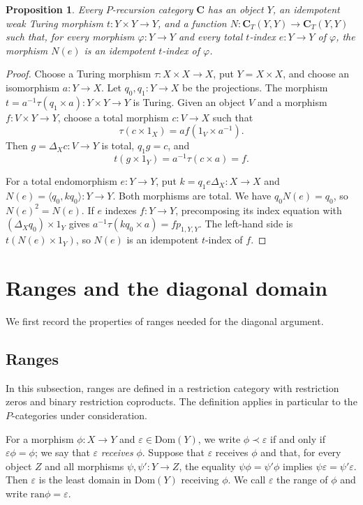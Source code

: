 \documentclass[letterpaper,10pt]{amsart}
\theoremstyle{plain}
\newtheorem{prop}[thm]{Proposition}
\theoremstyle{definition}
\begin{document}
\begin{prop}\label{IdempotentTheorem}
Every $P$-recursion category $\mathbf C$ has an object $Y$, an
idempotent weak Turing morphism $t:Y\times Y\to Y$, and a function
$N:\mathbf C_T(Y,Y)\to\mathbf C_T(Y,Y)$ such that, for every
morphism $\varphi:Y\to Y$ and every total $t$-index $e:Y\to Y$ of
$\varphi$, the morphism $N(e)$ is an idempotent $t$-index of $\varphi$.
\end{prop}
\begin{proof}
Choose a Turing morphism $\tau:X\times X\to X$, put $Y=X\times X$,
and choose an isomorphism $a:Y\to X$. Let $q_0,q_1:Y\to X$ be
the projections. The morphism
$t=a^{-1}\tau(q_1\times a):Y\times Y\to Y$ is Turing. Given an
object $V$ and a morphism $f:V\times Y\to Y$, choose a total
morphism $c:V\to X$ such that
\[
 \tau(c\times1_X)=af(1_V\times a^{-1}).
\]
Then $g=\Delta_Xc:V\to Y$ is total, $q_1g=c$, and
\[
 t(g\times1_Y)=a^{-1}\tau(c\times a)=f.
\]

For a total endomorphism $e:Y\to Y$, put
$k=q_1e\Delta_X:X\to X$ and $N(e)=\langle q_0,kq_0\rangle:Y\to Y$.
Both morphisms are total. We have $q_0N(e)=q_0$, so $N(e)^2=N(e)$. If $e$ indexes
$f:Y\to Y$, precomposing its index equation with
$(\Delta_Xq_0)\times1_Y$ gives
$a^{-1}\tau(kq_0\times a)=fp_{1,Y,Y}$.
The left-hand side is $t(N(e)\times1_Y)$, so $N(e)$ is an
idempotent $t$-index of $f$.
\end{proof}

\section{Ranges and the diagonal domain}\label{sec:diagonal}

We first record the properties of ranges needed for the diagonal argument.

\subsection{Ranges}\label{sec:ranges}
In this subsection, ranges are defined in a restriction category with
restriction zeros and binary restriction coproducts. The definition
applies in particular to the $P$-categories under consideration.

For a morphism $\phi:X\to Y$ and $\varepsilon\in\mathrm{Dom}(Y)$, we write
$\phi\prec\varepsilon$ if and only if $\varepsilon\phi=\phi$; we
say that $\varepsilon$ {\it receives} $\phi$. Suppose that
$\varepsilon$ receives $\phi$ and that, for every object $Z$ and all
morphisms $\psi,\psi':Y\to Z$, the equality
$\psi\phi=\psi'\phi$ implies
$\psi\varepsilon=\psi'\varepsilon$. Then $\varepsilon$ is the least
domain in $\mathrm{Dom}(Y)$ receiving $\phi$. We call $\varepsilon$
the range of $\phi$ and write $\mathrm{ran}\phi=\varepsilon$.
\end{document}

